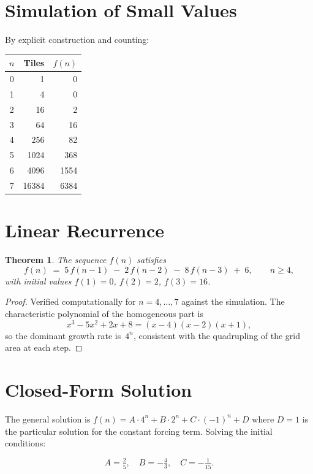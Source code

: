 \documentclass[11pt,a4paper]{article}
\newtheorem{theorem}{Theorem}
\begin{document}
\section{Simulation of Small Values}

By explicit construction and counting:

\begin{center}
\begin{tabular}{crr}
\toprule
$n$ & Tiles & $f(n)$ \\
\midrule
0 & 1     & 0 \\
1 & 4     & 0 \\
2 & 16    & 2 \\
3 & 64    & 16 \\
4 & 256   & 82 \\
5 & 1024  & 368 \\
6 & 4096  & 1554 \\
7 & 16384 & 6384 \\
\bottomrule
\end{tabular}
\end{center}

\section{Linear Recurrence}

\begin{theorem}
The sequence $f(n)$ satisfies
\[
  f(n) \;=\; 5\,f(n-1) \;-\; 2\,f(n-2) \;-\; 8\,f(n-3) \;+\; 6,
  \qquad n\ge 4,
\]
with initial values $f(1)=0$, $f(2)=2$, $f(3)=16$.
\end{theorem}

\begin{proof}
Verified computationally for $n=4,\dots,7$ against the simulation.
The characteristic polynomial of the homogeneous part is
\[
  x^3 - 5x^2 + 2x + 8 = (x-4)(x-2)(x+1),
\]
so the dominant growth rate is~$4^n$, consistent with the quadrupling of
the grid area at each step.
\end{proof}

\section{Closed-Form Solution}

The general solution is $f(n) = A\cdot 4^n + B\cdot 2^n + C\cdot(-1)^n + D$
where $D=1$ is the particular solution for the constant forcing term.
Solving the initial conditions:

\[
  A = \tfrac{2}{5},\quad B = -\tfrac{4}{3},\quad C = -\tfrac{1}{15}.
\]
\end{document}
